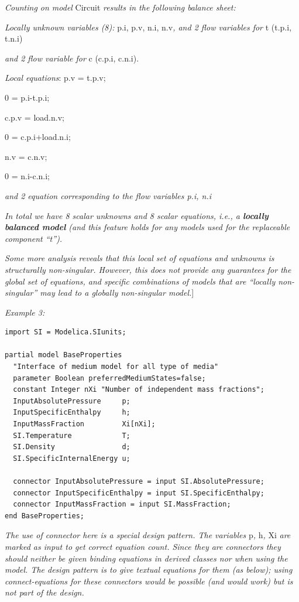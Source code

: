 \documentclass[10pt,a4paper]{report}
\begin{document}
\emph{Counting on model} Circuit \emph{results in the following balance
sheet:}

\emph{Locally unknown variables (8):} p.i, p.v, n.i, n.v\emph{, and 2
flow variables for} t (t.p.i, t.n.i)

\emph{and 2 flow variable for} c (c.p.i, c.n.i).

\emph{Local equations}: p.v = t.p.v;

0 = p.i-t.p.i;

c.p.v = load.n.v;

0 = c.p.i+load.n.i;

n.v = c.n.v;

0 = n.i-c.n.i;

\emph{and 2 equation corresponding to the flow variables p.i, n.i}

\emph{In total we have 8 scalar unknowns and 8 scalar equations, i.e., a
\textbf{locally} \textbf{balanced model} (and this feature holds for any
models used for the replaceable component ``t''). }

\emph{Some more analysis reveals that this local set of equations and
unknowns is structurally non-singular. However, this does not provide
any guarantees for the global set of equations, and specific
combinations of models that are ``locally non-singular'' may lead to a
globally non-singular model.}{]}

\emph{Example 3:}
\begin{lstlisting}[language=modelica]
import SI = Modelica.SIunits;

partial model BaseProperties
  "Interface of medium model for all type of media"
  parameter Boolean preferredMediumStates=false;
  constant Integer nXi "Number of independent mass fractions";
  InputAbsolutePressure     p;
  InputSpecificEnthalpy     h;
  InputMassFraction         Xi[nXi];
  SI.Temperature            T;
  SI.Density                d;
  SI.SpecificInternalEnergy u;
  
  connector InputAbsolutePressure = input SI.AbsolutePressure;
  connector InputSpecificEnthalpy = input SI.SpecificEnthalpy;
  connector InputMassFraction = input SI.MassFraction;
end BaseProperties;
\end{lstlisting}

\emph{The use of connector here is a special design pattern. The
variables} p\emph{,} h\emph{,} Xi \emph{are marked as input to get
correct equation count. Since they are connectors they should neither be
given binding equations in derived classes nor when using the model. The
design pattern is to give textual equations for them (as below); using
connect-equations for these connectors would be possible (and would
work) but is not part of the design.}
\end{document}
